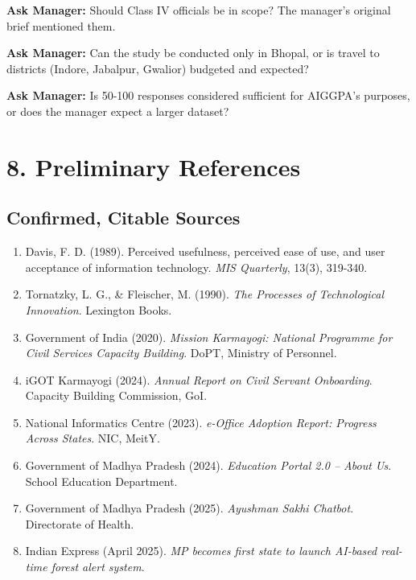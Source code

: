 \documentclass[12pt,a4paper]{article}
\newcommand{\managerQ}[1]{%
  \begin{tcolorbox}[colback=govgold!10,colframe=govgold,boxrule=0.5pt,arc=2mm,
    left=4pt,right=4pt,top=2pt,bottom=2pt]
    \small\textbf{Ask Manager:} #1
  \end{tcolorbox}
}
\begin{document}
\managerQ{Should Class IV officials be in scope? The manager's original brief mentioned them.}

\managerQ{Can the study be conducted only in Bhopal, or is travel to districts (Indore, Jabalpur, Gwalior) budgeted and expected?}

\managerQ{Is 50-100 responses considered sufficient for AIGGPA's purposes, or does the manager expect a larger dataset?}

\vspace{0.4cm}

\section{8. Preliminary References}

\subsection{Confirmed, Citable Sources}
\begin{enumerate}[leftmargin=1.5em]
  \item Davis, F. D. (1989). Perceived usefulness, perceived ease of use, and user acceptance of information technology. \textit{MIS Quarterly}, 13(3), 319-340.
  \item Tornatzky, L. G., \& Fleischer, M. (1990). \textit{The Processes of Technological Innovation}. Lexington Books.
  \item Government of India (2020). \textit{Mission Karmayogi: National Programme for Civil Services Capacity Building}. DoPT, Ministry of Personnel.
  \item iGOT Karmayogi (2024). \textit{Annual Report on Civil Servant Onboarding}. Capacity Building Commission, GoI.
  \item National Informatics Centre (2023). \textit{e-Office Adoption Report: Progress Across States}. NIC, MeitY.
  \item Government of Madhya Pradesh (2024). \textit{Education Portal 2.0 -- About Us}. School Education Department.
  \item Government of Madhya Pradesh (2025). \textit{Ayushman Sakhi Chatbot}. Directorate of Health.
  \item Indian Express (April 2025). \textit{MP becomes first state to launch AI-based real-time forest alert system}.
\end{enumerate}
\end{document}
